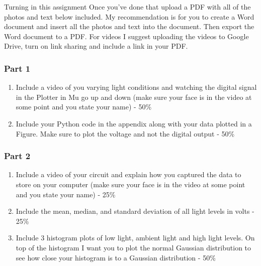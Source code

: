 Turning in this assignment
Once you've done that upload a PDF with all of the photos and text below included. My recommendation is for you to create a Word document and insert all the photos and text into the document. Then export the Word document to a PDF. For videos I suggest uploading the videos to Google Drive, turn on link sharing and include a link in your PDF.

\subsubsection{Part 1}
\begin{enumerate}[itemsep=-5pt]
\item Include a video of you varying light conditions and watching the digital signal in the Plotter in Mu go up and down (make sure your face is in the video at some point and you state your name) - 50\%
\item Include your Python code in the appendix along with your data plotted in a Figure. Make sure to plot the voltage and not the digital output - 50\%
\end{enumerate}

\subsubsection{Part 2}
\begin{enumerate}[itemsep=-5pt]
\item Include a video of your circuit and explain how you captured the data to store on your computer (make sure your face is in the video at some point and you state your name) - 25\%
\item Include the mean, median, and standard deviation of all light levels in volts - 25\%
\item Include 3 histogram plots of low light, ambient light and high light levels. On top of the histogram I want you to plot the normal Gaussian distribution to see how close your histogram is to a Gaussian distribution  - 50\%
\end{enumerate}